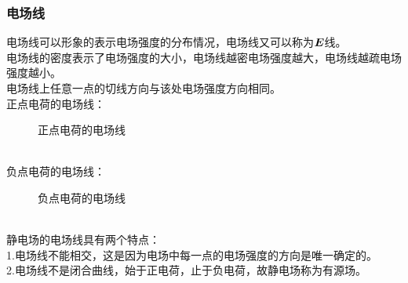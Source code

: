 \documentclass[UTF8]{ctexart}
\newcommand*{\veb}[1]{\vb*{#1}}
\begin{document}
\subsubsection{电场线}
    电场线可以形象的表示电场强度的分布情况，电场线又可以称为$\veb{E}$线。\\[3mm]
    电场线的密度表示了电场强度的大小，电场线越密电场强度越大，电场线越疏电场强度越小。\\[3mm]
    电场线上任意一点的切线方向与该处电场强度方向相同。\\[5mm]
    正点电荷的电场线：
    \begin{figure}[h]
        \begin{center}
            \caption{正点电荷的电场线}
        \end{center}
    \end{figure}\\
    负点电荷的电场线：
    \begin{figure}[h]
        \begin{center}
            \caption{负点电荷的电场线}
        \end{center}
    \end{figure}\\
    静电场的电场线具有两个特点：\\[3mm]
    1.电场线不能相交，这是因为电场中每一点的电场强度的方向是唯一确定的。\\[3mm]
    2.电场线不是闭合曲线，始于正电荷，止于负电荷，故静电场称为有源场。
\end{document}

